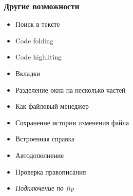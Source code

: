 \documentclass[aspectratio=169]{beamer}
\begin{document}
    \begin{frame}\frametitle{Другие возможности}
        \begin{itemize}
            \item Поиск в тексте
            \item Code folding
            \item Code highliting
            \item Вкладки
            \item Разделение окна на несколько частей
            \item Как файловый менеджер
            \item Сохранение истории изменения файла
            \item Встроенная справка
            \item Автодополнение
            \item Проверка правописания
            \item \textit{Подключение по ftp}
        \end{itemize}
    \end{frame}
\end{document}
